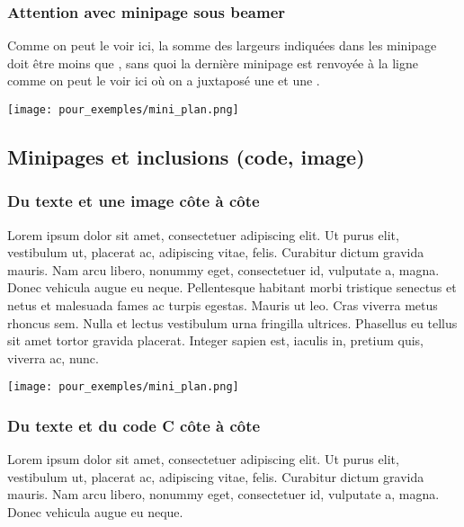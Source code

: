 \begin{frame}
  \frametitle{Attention avec minipage sous beamer}
  
  \begin{minipage}{0.6\textwidth}
  	Comme on peut le voir ici, la somme des largeurs indiquées dans les minipage doit être moins que  \lin{\textwidth}, sans quoi la dernière minipage est renvoyée à la ligne comme on peut le voir ici où on a juxtaposé une  et une .
  \end{minipage}
  \begin{minipage}{0.4\textwidth}
    \texttt{[image: pour\_exemples/mini\_plan.png]}
  \end{minipage}
\end{frame}


\subsection{Minipages et inclusions (code, image)}
\begin{frame}
  \frametitle{Du texte et une image côte à côte}
  
  \begin{minipage}{0.56\textwidth}
    Lorem ipsum dolor sit amet, consectetuer adipiscing elit. 
    Ut purus elit, vestibulum ut, placerat ac, adipiscing vitae, felis. 
    Curabitur dictum gravida mauris. 
    Nam arcu libero, nonummy eget, consectetuer id, vulputate a, magna. 
    Donec vehicula augue eu neque. 
    Pellentesque habitant morbi tristique senectus et netus et malesuada fames ac turpis egestas. 
    Mauris ut leo. Cras viverra metus rhoncus sem. 
    Nulla et lectus vestibulum urna fringilla ultrices.
    Phasellus eu tellus sit amet tortor gravida placerat. Integer sapien est,
    iaculis in, pretium quis, viverra ac, nunc.
  \end{minipage}
  \hfill
  \begin{minipage}{0.38\textwidth}
    \texttt{[image: pour\_exemples/mini\_plan.png]}
  \end{minipage}
\end{frame}

\begin{frame}
  \frametitle{Du texte et du code C côte à côte\esp}
  
  \begin{minipage}{0.4\textwidth}
    Lorem ipsum dolor sit amet, consectetuer adipiscing elit. 
    Ut purus elit, vestibulum ut, placerat ac, adipiscing vitae, felis. 
    Curabitur dictum gravida mauris. 
    Nam arcu libero, nonummy eget, consectetuer id, vulputate a, magna. 
    Donec vehicula augue eu neque. 
  \end{minipage}
  \begin{minipage}{0.58\textwidth}
    \inputminted[firstline=3, lastline=8,firstnumber=1]{c}{pour_exemples/main.c}
  \end{minipage}
\end{frame}

